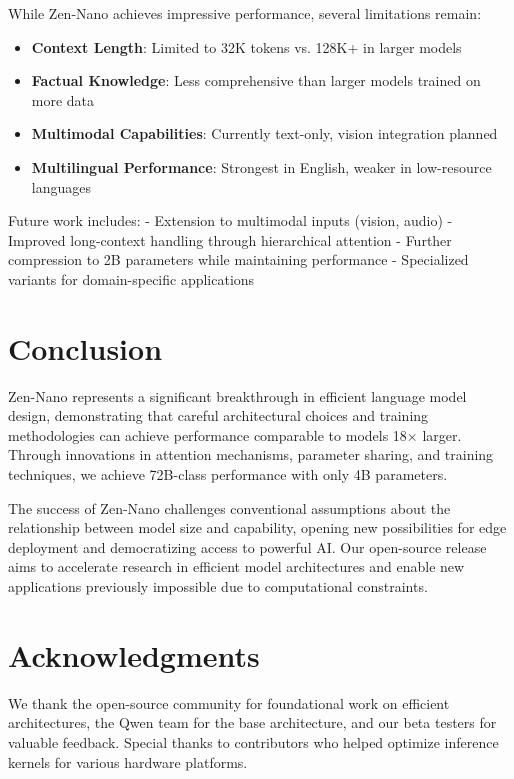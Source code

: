 \documentclass[11pt,a4paper]{article}
\begin{document}
While Zen-Nano achieves impressive performance, several limitations remain:

\begin{itemize}
    \item \textbf{Context Length}: Limited to 32K tokens vs. 128K+ in larger models
    \item \textbf{Factual Knowledge}: Less comprehensive than larger models trained on more data
    \item \textbf{Multimodal Capabilities}: Currently text-only, vision integration planned
    \item \textbf{Multilingual Performance}: Strongest in English, weaker in low-resource languages
\end{itemize}

Future work includes:
- Extension to multimodal inputs (vision, audio)
- Improved long-context handling through hierarchical attention
- Further compression to 2B parameters while maintaining performance
- Specialized variants for domain-specific applications

\section{Conclusion}

Zen-Nano represents a significant breakthrough in efficient language model design, demonstrating that careful architectural choices and training methodologies can achieve performance comparable to models 18× larger. Through innovations in attention mechanisms, parameter sharing, and training techniques, we achieve 72B-class performance with only 4B parameters.

The success of Zen-Nano challenges conventional assumptions about the relationship between model size and capability, opening new possibilities for edge deployment and democratizing access to powerful AI. Our open-source release aims to accelerate research in efficient model architectures and enable new applications previously impossible due to computational constraints.

\section*{Acknowledgments}

We thank the open-source community for foundational work on efficient architectures, the Qwen team for the base architecture, and our beta testers for valuable feedback. Special thanks to contributors who helped optimize inference kernels for various hardware platforms.
\end{document}

